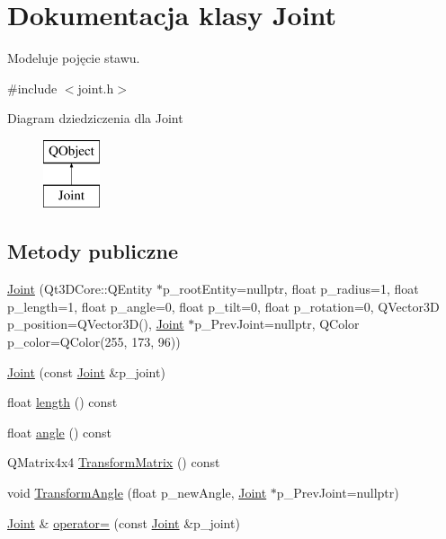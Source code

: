 \hypertarget{class_joint}{}\section{Dokumentacja klasy Joint}
\label{class_joint}


Modeluje pojęcie stawu.  




{\ttfamily \#include $<$joint.\+h$>$}

Diagram dziedziczenia dla Joint\begin{figure}[H]
\begin{center}
\leavevmode
\includegraphics[height=2.000000cm]{class_joint}
\end{center}
\end{figure}
\subsection*{Metody publiczne}
\begin{DoxyCompactItemize}
\item 
\hyperlink{class_joint_a0a60e63cceeb93ef8a308ebf2eaa8d68}{Joint} (Qt3\+D\+Core\+::\+Q\+Entity $\ast$p\+\_\+root\+Entity=nullptr, float p\+\_\+radius=1, float p\+\_\+length=1, float p\+\_\+angle=0, float p\+\_\+tilt=0, float p\+\_\+rotation=0, Q\+Vector3D p\+\_\+position=Q\+Vector3D(), \hyperlink{class_joint}{Joint} $\ast$p\+\_\+\+Prev\+Joint=nullptr, Q\+Color p\+\_\+color=Q\+Color(255, 173, 96))
\item 
\hyperlink{class_joint_a9652fa723eed6fe31e1ab4adccbb9c44}{Joint} (const \hyperlink{class_joint}{Joint} \&p\+\_\+joint)
\item 
float \hyperlink{class_joint_acf30d550f5ca1e0e5eb60dafdc83d202}{length} () const
\item 
float \hyperlink{class_joint_a305d99fa57d07d8ed3b478931e4e86e5}{angle} () const
\item 
Q\+Matrix4x4 \hyperlink{class_joint_a0bf632e9b7a8de79429be16f963e81f7}{Transform\+Matrix} () const
\item 
void \hyperlink{class_joint_ad2529cc3d781c18ead369c0ea42b700b}{Transform\+Angle} (float p\+\_\+new\+Angle, \hyperlink{class_joint}{Joint} $\ast$p\+\_\+\+Prev\+Joint=nullptr)
\item 
\hyperlink{class_joint}{Joint} \& \hyperlink{class_joint_a3cd9a9a2dc9226b2588c6ddab9659bed}{operator=} (const \hyperlink{class_joint}{Joint} \&p\+\_\+joint)
\end{DoxyCompactItemize}
